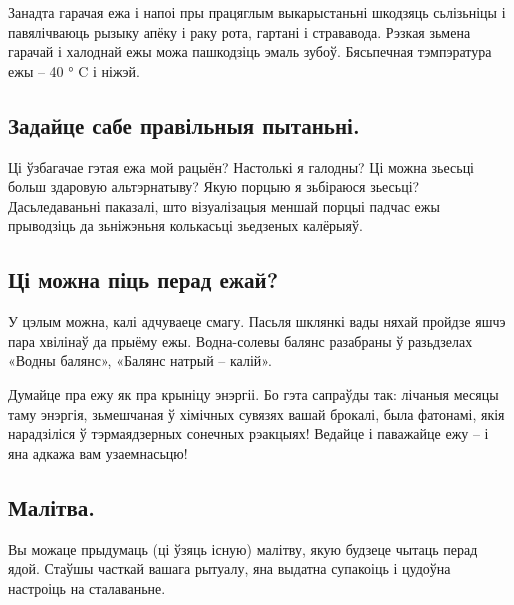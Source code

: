 Занадта гарачая ежа і напоі пры працяглым выкарыстаньні шкодзяць сьлізьніцы і павялічваюць рызыку апёку і раку рота, гартані і стрававода. Рэзкая зьмена гарачай і халоднай ежы можа пашкодзіць эмаль зубоў. Бясьпечная тэмпэратура ежы – 40 ° C і ніжэй.

\subsection{Задайце сабе правільныя пытаньні.}
Ці ўзбагачае гэтая ежа мой рацыён? Настолькі я галодны? Ці можна зьесьці больш здаровую альтэрнатыву? Якую порцыю я зьбіраюся зьесьці? Дасьледаваньні паказалі, што візуалізацыя меншай порцыі падчас ежы прыводзіць да зьніжэньня колькасьці зьедзеных калёрыяў.

\subsection{Ці можна піць перад ежай?}
У цэлым можна, калі адчуваеце смагу. Пасьля шклянкі вады няхай пройдзе яшчэ пара хвілінаў да прыёму ежы. Водна-солевы балянс разабраны ў разьдзелах «Водны балянс», «Балянс натрый – калій».

Думайце пра ежу як пра крыніцу энэргіі. Бо гэта сапраўды так: лічаныя месяцы таму энэргія, зьмешчаная ў хімічных сувязях вашай брокалі, была фатонамі, якія нарадзіліся ў тэрмаядзерных сонечных рэакцыях! Ведайце і паважайце ежу – і яна адкажа вам узаемнасьцю!

\subsection{Малітва.}
Вы можаце прыдумаць (ці ўзяць існую) малітву, якую будзеце чытаць перад ядой. Стаўшы часткай вашага рытуалу, яна выдатна супакоіць і цудоўна настроіць на сталаваньне.
